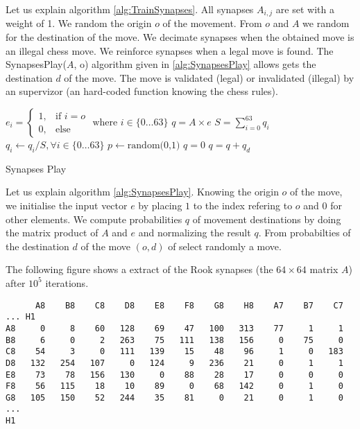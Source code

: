 \documentclass[a4paper,10pt]{article}
\begin{document}
Let us explain algorithm \ref{alg:TrainSynapses}. All synapses $A_{i,j}$ are set
with a weight of 1. We random the origin $o$ of the movement. From $o$ and $A$
we random for the destination of the move.  We decimate synapses when the
obtained move is an illegal chess move.  We reinforce synapses when a legal move
is found. The SynapsesPlay($A$, o) algorithm given in \ref{alg:SynapsesPlay}
allows gets the destination $d$ of the move. The move is validated (legal) or
invalidated (illegal) by an supervizor (an hard-coded function knowing the chess
rules).

\begin{algorithm}
  \SetNoFillComment
  \label{alg:SynapsesPlay}
  \DontPrintSemicolon
  \;
  $e_i =
  \begin{cases}
    1,& \text{if } i = o \\
    0,& \text{else}
  \end{cases} \text{ where } i \in \{0 \dotsc 63\}$\;
  \;
  $q = A \times e$\;
  $S = \sum_{i=0}^{63}q_i$\;
  $q_i \gets q_i / S, \forall i \in \{0 \dotsc 63\}$\;
  \;
  $p \gets \text{random(0,1)}$\;
  $q = 0$\;
  {
    $q = q + q_d$\;
       {
       }
  }
  \caption{Synapses Play}
\end{algorithm}

Let us explain algorithm \ref{alg:SynapsesPlay}. Knowing the origin $o$ of the
move, we initialise the input vector $e$ by placing $1$ to the index refering to
$o$ and 0 for other elements. We compute probabilities $q$ of movement
destinations by doing the matrix product of $A$ and $e$ and normalizing the
result $q$. From probabilties of the destination $d$ of the move $(o, d)$ of
select randomly a move.

The following figure shows a extract of the Rook synapses (the $64 \times 64$
matrix $A$) after $10^5$ iterations.

\begin{verbatim}
      A8    B8    C8    D8    E8    F8    G8    H8    A7    B7    C7 ... H1
A8     0     8    60   128    69    47   100   313    77     1     1
B8     6     0     2   263    75   111   138   156     0    75     0
C8    54     3     0   111   139    15    48    96     1     0   183
D8   132   254   107     0   124     9   236    21     0     1     1
E8    73    78   156   130     0    88    28    17     0     0     0
F8    56   115    18    10    89     0    68   142     0     1     0
G8   105   150    52   244    35    81     0    21     0     1     0
...
H1
\end{verbatim}
\end{document}
